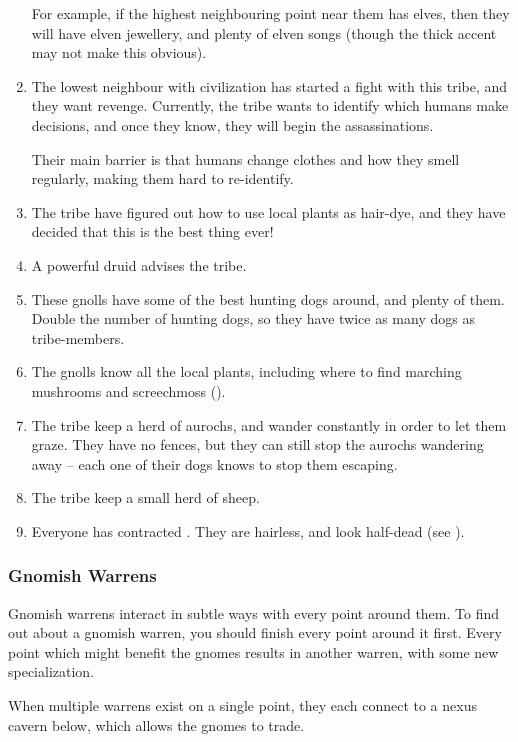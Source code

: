 \begin{multicols}{2}
\begin{enumerate}
  For example, if the highest neighbouring point near them has elves, then they will have elven jewellery, and plenty of elven songs (though the thick accent may not make this obvious).
  \item
  The lowest neighbour with civilization has started a fight with this tribe, and they want revenge.
  Currently, the tribe wants to identify which humans make decisions, and once they know, they will begin the assassinations.

  Their main barrier is that humans change clothes and how they smell regularly, making them hard to re-identify.
  \item
  The tribe have figured out how to use local plants as hair-dye, and they have decided that this is the best thing ever!
  \item
  A powerful druid advises the tribe.
  \item
  These gnolls have some of the best hunting dogs around, and plenty of them.
  Double the number of hunting dogs, so they have twice as many dogs as tribe-members.
  \item
  The gnolls know all the local plants, including where to find marching mushrooms and screechmoss ().
  \item
  The tribe keep a herd of aurochs, and wander constantly in order to let them graze.
  They have no fences, but they can still stop the aurochs wandering away -- each one of their dogs knows to stop them escaping.
  \item
  The tribe keep a small herd of sheep.
  \item
  Everyone has contracted .
  They are hairless, and look half-dead
  (see ).
\end{enumerate}

\subsubsection{Gnomish Warrens}
\label{gnomePoint}

Gnomish warrens interact in subtle ways with every point around them.
To find out about a gnomish warren, you should finish every point around it first.
Every point which might benefit the gnomes results in another warren, with some new specialization.

When multiple warrens exist on a single point, they each connect to a nexus cavern below, which allows the gnomes to trade.


\end{multicols}
